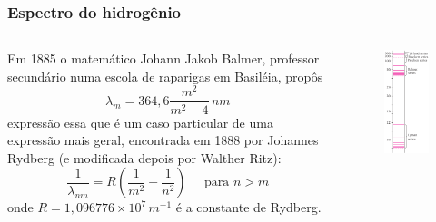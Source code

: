 \documentclass[12pt,brazil]{beamer}
\begin{document}
\begin{frame}
  \frametitle{Espectro do hidrogênio}
    \begin{columns}[c]

      \column{6cm}
        \fontsize{9pt}{11pt}\selectfont
        Em 1885 o matemático  Johann Jakob Balmer, professor secundário numa escola de raparigas em Basiléia, propôs
        \[
         \lambda_m = 364,6 \dfrac{m^2}{m^2 - 4}\,nm
        \]
        expressão essa que é um caso particular de uma expressão mais geral, encontrada em 1888 por  Johannes Rydberg (e modificada depois por Walther Ritz):
        \[
         \dfrac{1}{\lambda_{nm}} = R\left( \dfrac{1}{m^2} - \dfrac{1}{n^2} \right)\;\;\;\;\;\text{para }n > m
        \]
        onde $R=1,096776\times10^7\,m^{-1}$ é a constante de Rydberg.

      
      \column{4cm}
        \vspace*{-0.75cm}
        \begin{figure}
          \includegraphics[width=3.5cm]{figuras/fig03}
        \end{figure}
      
    \end{columns}

\end{frame}



\end{document}
